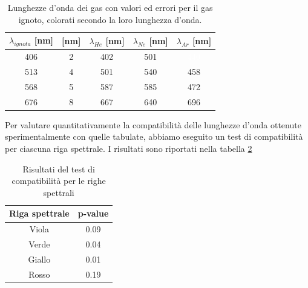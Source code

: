 \documentclass[letterpaper,12pt]{article}
\begin{document}
\begin{table}[h!]
    \centering
    \begin{tabular}{|c|c|c|c|c|}
    \hline
    \textbf{$\lambda_{ignota}$} [nm] & \text{$\pm\sigma_\text{ignoto}$} [nm] & \textbf{$\lambda_{He}$} [nm] & \textbf{$\lambda_{Ne}$} [nm] & \textbf{$\lambda_{Ar}$} [nm]\\
    \hline
    \cellcolor{wavelength_406} 406 & \cellcolor{wavelength_nan}2 & \cellcolor{wavelength_402} 402 & \cellcolor{wavelength_501} 501 & \cellcolor{wavelength_440} \textcolor{white} {440} \\
    \hline
    \cellcolor{wavelength_513} 513 & \cellcolor{wavelength_nan}4 & \cellcolor{wavelength_501} 501 & \cellcolor{wavelength_540} 540 & \cellcolor{wavelength_458} 458 \\
    \hline
    \cellcolor{wavelength_568} 568 & \cellcolor{wavelength_nan}5 & \cellcolor{wavelength_587} 587 & \cellcolor{wavelength_585} 585 & \cellcolor{wavelength_472} 472 \\
    \hline
    \cellcolor{wavelength_676} 676 & \cellcolor{wavelength_nan}8 & \cellcolor{wavelength_667} 667 & \cellcolor{wavelength_640} 640 & \cellcolor{wavelength_696} 696 \\
    \hline
    \end{tabular}
    \caption{Lunghezze d'onda dei gas con valori ed errori per il gas ignoto, colorati secondo la loro lunghezza d'onda.}
    \label{tab:prisma_ignoto}
\end{table}

Per valutare quantitativamente la compatibilità delle lunghezze d'onda ottenute sperimentalmente con quelle tabulate, 
abbiamo eseguito un test di compatibilità per ciascuna riga spettrale. I risultati sono riportati nella tabella \ref{tab:compatibility_test_prisma}

\begin{table}[h!]
    \centering
    \begin{tabular}{|c|c|}
    \hline
    \textbf{Riga spettrale} & \textbf{p-value} \\
    \hline
    Viola & 0.09 \\
    \hline
    Verde & 0.04 \\
    \hline
    Giallo & 0.01 \\
    \hline
    Rosso & 0.19 \\
    \hline
    \end{tabular}
    \caption{Risultati del test di compatibilità per le righe spettrali}
    \label{tab:compatibility_test_prisma}
\end{table}
\end{document}
